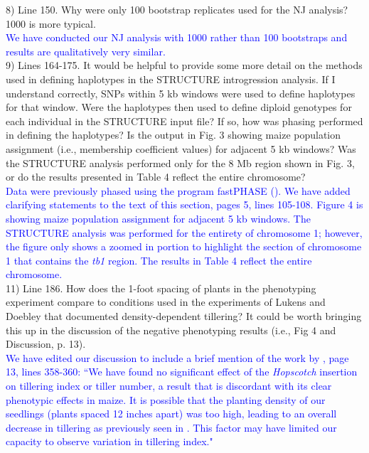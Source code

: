 \documentclass[11pt]{article}
\newcommand{\res}[1]{\noindent \textcolor{blue}{{#1}} \\}
\begin{document}
8) Line 150. Why were only 100 bootstrap replicates used for the NJ analysis? 1000 is more typical.\\

\res{We have conducted our NJ analysis with 1000 rather than 100 bootstraps and results are qualitatively very similar.}

9) Lines 164-175. It would be helpful to provide some more detail on the methods used in defining haplotypes in the STRUCTURE introgression analysis. If I understand correctly, SNPs within 5 kb windows were used to define haplotypes for that window. Were the haplotypes then used to define diploid genotypes for each individual in the STRUCTURE input file? If so, how was phasing performed in defining the haplotypes? Is the output in Fig. 3 showing maize population assignment (i.e., membership coefficient values) for adjacent 5 kb windows? Was the STRUCTURE analysis performed only for the 8 Mb region shown in Fig. 3, or do the results presented in Table 4 reflect the entire chromosome? \\

\res{Data were previously phased using the program fastPHASE (\citet{Pyhajarvi2013, Scheet2006}). We have added clarifying statements to the text of this section, pages 5, lines 105-108. Figure 4 is showing maize population assignment for adjacent 5 kb windows. The STRUCTURE analysis was performed for the entirety of chromosome 1; however, the figure only shows a zoomed in portion to highlight the section of chromosome 1 that contains the \emph{tb1} region. The results in Table 4 reflect the entire chromosome.}

11) Line 186. How does the 1-foot spacing of plants in the phenotyping experiment compare to conditions used in the experiments of Lukens and Doebley that documented density-dependent tillering? It could be worth bringing this up in the discussion of the negative phenotyping results (i.e., Fig 4 and Discussion, p. 13). \\

\res{We have edited our discussion to include a brief mention of the work by \citet{LukensDoebley1999}, page 13, lines 358-360: ``We have found no significant effect of the \emph{Hopscotch} insertion on tillering index or tiller number, a result that is discordant with its clear phenotypic effects in maize. It is possible that the planting density of our seedlings (plants spaced 12 inches apart) was too high, leading to an overall decrease in tillering as previously seen in \citet{LukensDoebley1999}.  This factor may have limited our capacity to observe variation in tillering index."}
\end{document}
